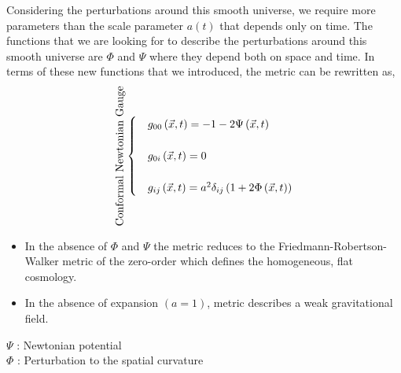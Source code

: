 Considering the perturbations around this smooth universe, we require more parameters than the scale parameter $a\left(t\right)$ that depends only on time. The functions that we are looking for to describe the perturbations around this smooth universe are $\Phi$ and $\Psi$ where they depend both on space and time. In terms of these new functions that we introduced, the metric can be rewritten as,
\begin{align*}
\rotatebox[origin=c]{90}{Conformal Newtonian Gauge}
\begin{cases}
&g_{00}\left(\vec{x},t\right) = -1-2\Psi\left(\vec{x},t\right)\\\\
&g_{0i}\left(\vec{x},t\right) = 0\\\\
&g_{ij}\left(\vec{x},t\right) = a^{2}\delta_{ij}\left(1 + 2\Phi\left(\vec{x},t\right)\right)
\end{cases}
\end{align*} 

\begin{itemize}
\item In the absence of $\Phi$ and $\Psi$ the metric reduces to the Friedmann-Robertson-Walker metric of the zero-order which defines the homogeneous, flat cosmology.
\item In the absence of expansion $\left(a=1\right)$, metric describes a weak gravitational field.
\end{itemize}

$\Psi$ : Newtonian potential\\
$\Phi$ : Perturbation to the spatial curvature



